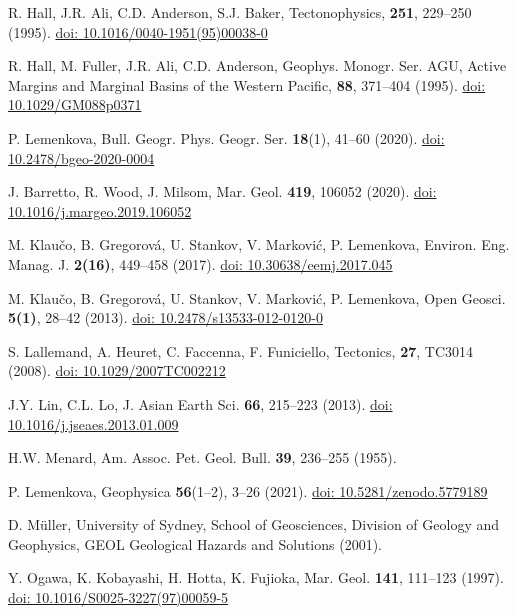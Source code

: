 \documentclass{rrparticle}
\begin{document}
\begin{thebibliography}{99}
 R. Hall, J.R. Ali, C.D. Anderson, S.J. Baker, Tectonophysics, \textbf{251}, 229--250 (1995). \href{https://doi.org/10.1016/0040-1951(95)00038-0}{doi: 10.1016/0040-1951(95)00038-0}

 R. Hall, M. Fuller, J.R. Ali, C.D. Anderson, Geophys. Monogr. Ser. AGU, Active Margins and Marginal Basins of the Western Pacific, \textbf{88}, 371--404 (1995). \href{https://doi.org/10.1029/GM088p0371}{doi: 10.1029/GM088p0371}

 P. Lemenkova, Bull. Geogr. Phys. Geogr. Ser. \textbf{18}(1), 41--60 (2020). \href{https://doi.org/10.2478/bgeo-2020-0004}{doi: 10.2478/bgeo-2020-0004}

 J. Barretto, R. Wood, J. Milsom, Mar. Geol. \textbf {419}, 106052 (2020). \href{https://doi.org/10.1016/j.margeo.2019.106052}{doi: 10.1016/j.margeo.2019.106052}

 M. Klaučo, B. Gregorová, U. Stankov, V. Marković, P. Lemenkova, Environ. Eng. Manag. J. \textbf{2(16)}, 449--458 (2017). \href{https://doi.org/10.30638/eemj.2017.045}{doi: 10.30638/eemj.2017.045} 

 M. Klaučo, B. Gregorová, U. Stankov, V. Marković, P. Lemenkova, Open Geosci. \textbf{5(1)}, 28--42 (2013). \href{https://doi.org/10.2478/s13533-012-0120-0}{doi: 10.2478/s13533-012-0120-0}

S. Lallemand, A. Heuret, C. Faccenna, F. Funiciello, Tectonics, \textbf{27}, TC3014 (2008). \href{https://doi.org/10.1029/2007TC002212}{doi: 10.1029/2007TC002212}

 J.Y. Lin, C.L. Lo, J. Asian Earth Sci. \textbf{66}, 215--223 (2013). \href{https://doi.org/10.1016/j.jseaes.2013.01.009}{doi: 10.1016/j.jseaes.2013.01.009}

 H.W. Menard, Am. Assoc. Pet. Geol. Bull. \textbf{39}, 236--255 (1955).

P. Lemenkova, Geophysica \textbf{56}(1--2), 3--26 (2021). \href{https://doi.org/10.5281/zenodo.5779189}{doi: 10.5281/zenodo.5779189}

 D. M\"uller, University of Sydney, School of Geosciences, Division of Geology and Geophysics, GEOL Geological Hazards and Solutions (2001).

 Y. Ogawa, K. Kobayashi, H. Hotta, K. Fujioka, Mar. Geol. \textbf{141}, 111--123 (1997). \href{https://doi.org/10.1016/S0025-3227(97)00059-5}{doi: 10.1016/S0025-3227(97)00059-5}


\end{thebibliography}
\end{document}
